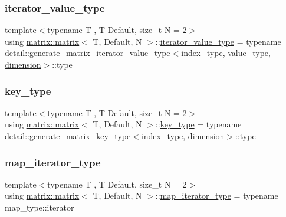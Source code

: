\subsubsection{\texorpdfstring{iterator\+\_\+value\+\_\+type}{iterator\_value\_type}}
{\footnotesize\ttfamily template$<$typename T , T Default, size\+\_\+t N = 2$>$ \\
using \hyperlink{structmatrix_1_1matrix}{matrix\+::matrix}$<$ T, Default, N $>$\+::\hyperlink{structmatrix_1_1matrix_a1de5c69f5d9e3b6d3e54b1e4cb433d65}{iterator\+\_\+value\+\_\+type} =  typename \hyperlink{classmatrix_1_1detail_1_1generate__matrix__iterator__value__type}{detail\+::generate\+\_\+matrix\+\_\+iterator\+\_\+value\+\_\+type}$<$\hyperlink{structmatrix_1_1matrix_a87b61e7f35dcd5991cd3f243cfeced06}{index\+\_\+type}, \hyperlink{structmatrix_1_1matrix_ab940e7a84942339cdee7c0f0d3bd8ef9}{value\+\_\+type}, \hyperlink{structmatrix_1_1matrix_a7d76bd51fd998974f59ea4035e053f74}{dimension}$>$\+::type}

\mbox{\label{structmatrix_1_1matrix_af7b5498ac1b615cb9ef51bd185a2557e}} 
\subsubsection{\texorpdfstring{key\+\_\+type}{key\_type}}
{\footnotesize\ttfamily template$<$typename T , T Default, size\+\_\+t N = 2$>$ \\
using \hyperlink{structmatrix_1_1matrix}{matrix\+::matrix}$<$ T, Default, N $>$\+::\hyperlink{structmatrix_1_1matrix_af7b5498ac1b615cb9ef51bd185a2557e}{key\+\_\+type} =  typename \hyperlink{classmatrix_1_1detail_1_1generate__matrix__key__type}{detail\+::generate\+\_\+matrix\+\_\+key\+\_\+type}$<$\hyperlink{structmatrix_1_1matrix_a87b61e7f35dcd5991cd3f243cfeced06}{index\+\_\+type}, \hyperlink{structmatrix_1_1matrix_a7d76bd51fd998974f59ea4035e053f74}{dimension}$>$\+::type}

\mbox{\label{structmatrix_1_1matrix_a718c745a811e13b64ba21239288666a6}} 
\subsubsection{\texorpdfstring{map\+\_\+iterator\+\_\+type}{map\_iterator\_type}}
{\footnotesize\ttfamily template$<$typename T , T Default, size\+\_\+t N = 2$>$ \\
using \hyperlink{structmatrix_1_1matrix}{matrix\+::matrix}$<$ T, Default, N $>$\+::\hyperlink{structmatrix_1_1matrix_a718c745a811e13b64ba21239288666a6}{map\+\_\+iterator\+\_\+type} =  typename map\+\_\+type\+::iterator}

